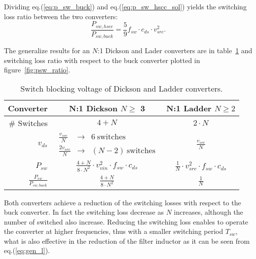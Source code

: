 Dividing eq.(\ref{eq:p_sw_buck}) and eq.(\ref{eq:p_sw_hscc_sol}) yields the switching loss ratio between the two converters:
\begin{equation}
\frac{P_{sw,hscc}}{P_{sw,buck}} =  \frac{5}{9}  f_{sw} \cdot c_{ds} \cdot v_{src}^2.
\label{eq:p_sw_hscc_sol}
\end{equation}

The generalize results for an $N$:1 Dickson and Lader converters are in table~\ref{tab:Dick_Ladder_v_blk} and switching loss ratio with respect to the buck converter plotted in figure~\ref{fig:psw_ratio}.
\begin{table}[h]
\centering
\caption{Switch blocking voltage of Dickson and Ladder converters.}
\label{tab:Dick_Ladder_v_blk}
\renewcommand{\arraystretch}{1.5}%
\begin{tabular}{r | c  c   }
 Converter &  N:1 Dickson  $ N \geq$ 3  &  N:1 Ladder $ N \geq 2$  \\
 \midrule
\# Switches & $ 4 + N $  & $2 \cdot N$ \\
 $v_{ds}$ & $\begin{array} {rcl} \frac{v_{src}}{N}   & \to &  6~ \text{switches} \\
                                           \frac{2 v_{src}}{N} & \to &  (N - 2) ~\text{switches}
                       \end{array}$
                       &   $ \frac{v_{src}}{N} $ \\
 $ P_{sw}$ &  $ \frac{4+N}{8 \cdot N^2} \cdot v_{vin}^2 \cdot f_{sw}  \cdot {c_{ds}} $ &  $ \frac{1}{ N} \cdot v_{src}^2 \cdot f_{sw} \cdot {c_{ds}} $  \\
 $ \frac{P_{sw}}{P_{sw,buck}}$ &  $ \frac{4+N}{8 \cdot N^2}  $ &  $ \frac{1}{ N}  $  \\


 \end{tabular}
\end{table}

Both converters achieve a reduction of the switching losses with respect to the buck converter. In fact the switching loss decrease as $N$ increases, although the number of switched also increase. Reducing the switching loss enables to operate the converter at higher frequencies, thus with a smaller switching period $T_{sw}$, what is also effective in the reduction of the filter inductor as it can be seen from eq.(\ref{eq:gen_l}).

